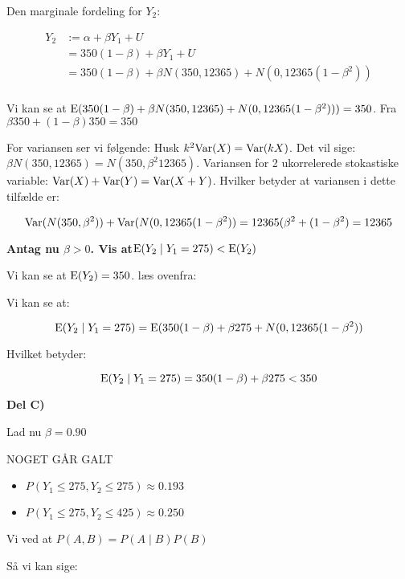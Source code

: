 Den marginale fordeling for $Y_2$:

\begin{align}
    Y_2 &:= \alpha + \beta Y_1 + U \\
        &= 350(1-\beta) + \beta Y_1 + U \\
        &= 350(1-\beta) + \beta N(350, 12365) + N(0, 12365(1 -\beta^2)) \\
\end{align}

Vi kan se at $\text{E}(350(1-\beta) + \beta N(350, 12365) + N(0, 12365(1 -\beta^2))) = 350$. Fra $\beta 350 + (1-\beta)350 = 350$

For variansen ser vi følgende: Husk $k^2 \text{Var}(X) = \text{Var}(kX)$. Det vil sige: $\beta N(350, 12365) = N(350, \beta^2 12365)$. Variansen for 2 ukorrelerede stokastiske variable: $\text{Var}(X) + \text{Var}(Y) = \text{Var}(X + Y)$. Hvilker betyder at variansen i dette tilfælde er:

\begin{equation}
    \text{Var}(N(350, \beta^2)) + \text{Var}(N(0, 12365(1-\beta^2)) =12365( \beta^2 + (1 -\beta^2) = 12365
\end{equation}

\textbf{Antag nu $\beta > 0$. Vis at$\text{E}(Y_2 \mid Y_1 = 275) <\text{E}(Y_2)$}

Vi kan se at $\text{E}(Y_2) = 350$. læs ovenfra:

Vi kan se at:

\begin{equation}
    \text{E}(Y_2 \mid Y_1 = 275) = \text{E}(350(1 - \beta) + \beta275 + N(0,12365(1-\beta^2))
\end{equation}

Hvilket betyder:

\begin{equation}
    \text{E}(Y_2 \mid Y_1 = 275) = 350(1-\beta) + \beta 275 < 350
\end{equation}

\textbf{Del C)}

Lad nu \textbf{$\beta = 0.90$}
 
 NOGET GÅR GALT
 
\begin{itemize}
    \item $P(Y_1 \leq 275, Y_2 \leq 275) \approx 0.193$
    \item $P(Y_1 \leq 275, Y_2 \leq 425) \approx 0.250$
\end{itemize}

Vi ved at $P(A , B) = P( A \mid B) P(B) $

Så vi kan sige:

